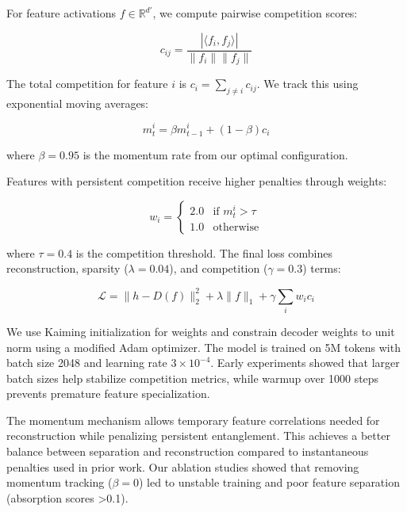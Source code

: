 \documentclass{article} %
\begin{document}
For feature activations $f \in \mathbb{R}^{d'}$, we compute pairwise competition scores:

\begin{equation}
c_{ij} = \frac{|\langle f_i, f_j \rangle|}{\|f_i\|\|f_j\|}
\end{equation}

The total competition for feature $i$ is $c_i = \sum_{j \neq i} c_{ij}$. We track this using exponential moving averages:

\begin{equation}
m_t^i = \beta m_{t-1}^i + (1-\beta)c_i
\end{equation}

where $\beta=0.95$ is the momentum rate from our optimal configuration.

Features with persistent competition receive higher penalties through weights:

\begin{equation}
w_i = \begin{cases}
2.0 & \text{if } m_t^i > \tau \\
1.0 & \text{otherwise}
\end{cases}
\end{equation}

where $\tau=0.4$ is the competition threshold. The final loss combines reconstruction, sparsity ($\lambda=0.04$), and competition ($\gamma=0.3$) terms:

\begin{equation}
\mathcal{L} = \|h - D(f)\|_2^2 + \lambda\|f\|_1 + \gamma\sum_i w_i c_i
\end{equation}

We use Kaiming initialization for weights and constrain decoder weights to unit norm using a modified Adam optimizer. The model is trained on 5M tokens with batch size 2048 and learning rate $3\times10^{-4}$. Early experiments showed that larger batch sizes help stabilize competition metrics, while warmup over 1000 steps prevents premature feature specialization.

The momentum mechanism allows temporary feature correlations needed for reconstruction while penalizing persistent entanglement. This achieves a better balance between separation and reconstruction compared to instantaneous penalties used in prior work. Our ablation studies showed that removing momentum tracking ($\beta=0$) led to unstable training and poor feature separation (absorption scores >0.1).
\end{document}
